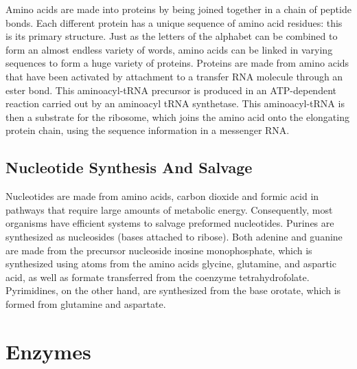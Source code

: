 Amino acids are made into proteins by being joined together in a chain of peptide bonds. Each different protein has a unique sequence of amino acid residues: this is its primary structure. Just as the letters of the alphabet can be combined to form an almost endless variety of words, amino acids can be linked in varying sequences to form a huge variety of proteins. Proteins are made from amino acids that have been activated by attachment to a transfer RNA molecule through an ester bond. This aminoacyl-tRNA precursor is produced in an ATP-dependent reaction carried out by an aminoacyl tRNA synthetase. This aminoacyl-tRNA is then a substrate for the ribosome, which joins the amino acid onto the elongating protein chain, using the sequence information in a messenger RNA.

\hypertarget{nucleotide-synthesis-and-salvage}{%
\subsection{Nucleotide Synthesis And Salvage}\label{nucleotide-synthesis-and-salvage}}

Nucleotides are made from amino acids, carbon dioxide and formic acid in pathways that require large amounts of metabolic energy. Consequently, most organisms have efficient systems to salvage preformed nucleotides. Purines are synthesized as nucleosides (bases attached to ribose). Both adenine and guanine are made from the precursor nucleoside inosine monophosphate, which is synthesized using atoms from the amino acids glycine, glutamine, and aspartic acid, as well as formate transferred from the coenzyme tetrahydrofolate. Pyrimidines, on the other hand, are synthesized from the base orotate, which is formed from glutamine and aspartate.

\hypertarget{enzymes}{%
\section{Enzymes}\label{enzymes}}


